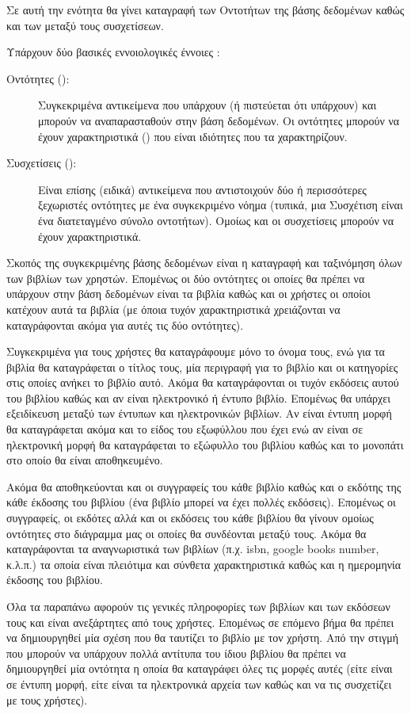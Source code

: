 \documentclass{assignment}
\begin{document}
Σε αυτή την ενότητα θα γίνει καταγραφή των Οντοτήτων της βάσης δεδομένων καθώς και των μεταξύ τους συσχετίσεων.

Υπάρχουν δύο βασικές εννοιολογικές έννοιες \cite{class_notes}:
\begin{description}
  \item[Οντότητες ():] Συγκεκριμένα αντικείμενα που υπάρχουν (ή πιστεύεται ότι υπάρχουν) και μπορούν να αναπαρασταθούν στην βάση δεδομένων. Οι οντότητες μπορούν να έχουν χαρακτηριστικά () που είναι ιδιότητες που τα χαρακτηρίζουν.
  \item[Συσχετίσεις ():] Είναι επίσης (ειδικά) αντικείμενα που αντιστοιχούν δύο ή περισσότερες ξεχωριστές οντότητες με ένα συγκεκριμένο νόημα (τυπικά, μια Συσχέτιση είναι ένα διατεταγμένο σύνολο οντοτήτων). Ομοίως και οι συσχετίσεις μπορούν να έχουν χαρακτηριστικά.
\end{description}

Σκοπός της συγκεκριμένης βάσης δεδομένων είναι η καταγραφή και ταξινόμηση όλων των βιβλίων των χρηστών. Επομένως οι δύο οντότητες οι οποίες θα πρέπει να υπάρχουν στην βάση δεδομένων είναι τα βιβλία καθώς και οι χρήστες οι οποίοι κατέχουν αυτά τα βιβλία (με όποια τυχόν χαρακτηριστικά χρειάζονται να καταγράφονται ακόμα για αυτές τις δύο οντότητες).

Συγκεκριμένα για τους χρήστες θα καταγράφουμε μόνο το όνομα τους, ενώ για τα βιβλία θα καταγράφεται ο τίτλος τους, μία περιγραφή για το βιβλίο και οι κατηγορίες στις οποίες ανήκει το βιβλίο αυτό. Ακόμα θα καταγράφονται οι τυχόν εκδόσεις αυτού του βιβλίου καθώς και αν είναι ηλεκτρονικό ή έντυπο βιβλίο. Επομένως θα υπάρχει εξειδίκευση μεταξύ των έντυπων και ηλεκτρονικών βιβλίων. Αν είναι έντυπη μορφή θα καταγράφεται ακόμα και το είδος του εξωφύλλου που έχει ενώ αν είναι σε ηλεκτρονική μορφή θα καταγράφεται το εξώφυλλο του βιβλίου καθώς και το μονοπάτι στο οποίο θα είναι αποθηκευμένο.

Ακόμα θα αποθηκεύονται και οι συγγραφείς του κάθε βιβλίο καθώς και ο εκδότης της κάθε έκδοσης του βιβλίου (ένα βιβλίο μπορεί να έχει πολλές εκδόσεις). Επομένως οι συγγραφείς, οι εκδότες αλλά και οι εκδόσεις του κάθε βιβλίου θα γίνουν ομοίως οντότητες στο διάγραμμα μας οι οποίες θα συνδέονται μεταξύ τους. Ακόμα θα καταγράφονται τα αναγνωριστικά των βιβλίων (π.χ. isbn, google books number, κ.λ.π.) τα οποία είναι πλειότιμα και σύνθετα χαρακτηριστικά καθώς και η ημερομηνία έκδοσης του βιβλίου.

Όλα τα παραπάνω αφορούν τις γενικές πληροφορίες των βιβλίων και των εκδόσεων τους και είναι ανεξάρτητες από τους χρήστες. Επομένως σε επόμενο βήμα θα πρέπει να δημιουργηθεί μία σχέση που θα ταυτίζει το βιβλίο με τον χρήστη. Από την στιγμή που μπορούν να υπάρχουν πολλά αντίτυπα του ίδιου βιβλίου θα πρέπει να δημιουργηθεί μία οντότητα η οποία θα καταγράφει όλες τις μορφές αυτές (είτε είναι σε έντυπη μορφή, είτε είναι τα ηλεκτρονικά αρχεία των  καθώς και να τις συσχετίζει με τους χρήστες).
\end{document}
